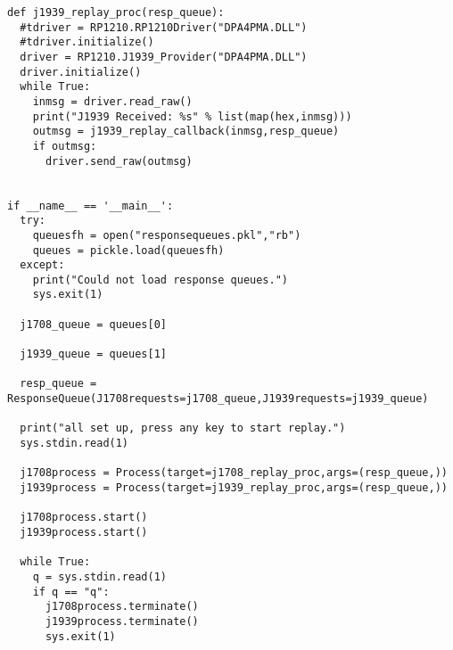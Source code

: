 \begin{verbatim}
def j1939_replay_proc(resp_queue):
  #tdriver = RP1210.RP1210Driver("DPA4PMA.DLL")
  #tdriver.initialize()
  driver = RP1210.J1939_Provider("DPA4PMA.DLL")
  driver.initialize()
  while True:
    inmsg = driver.read_raw()
    print("J1939 Received: %s" % list(map(hex,inmsg)))
    outmsg = j1939_replay_callback(inmsg,resp_queue)
    if outmsg:
      driver.send_raw(outmsg)


if __name__ == '__main__':
  try:
    queuesfh = open("responsequeues.pkl","rb")
    queues = pickle.load(queuesfh)
  except:
    print("Could not load response queues.")
    sys.exit(1)

  j1708_queue = queues[0]
  
  j1939_queue = queues[1]

  resp_queue = ResponseQueue(J1708requests=j1708_queue,J1939requests=j1939_queue)

  print("all set up, press any key to start replay.")
  sys.stdin.read(1)

  j1708process = Process(target=j1708_replay_proc,args=(resp_queue,))
  j1939process = Process(target=j1939_replay_proc,args=(resp_queue,))

  j1708process.start()
  j1939process.start()

  while True:
    q = sys.stdin.read(1)
    if q == "q":
      j1708process.terminate()
      j1939process.terminate()
      sys.exit(1)




\end{verbatim}

